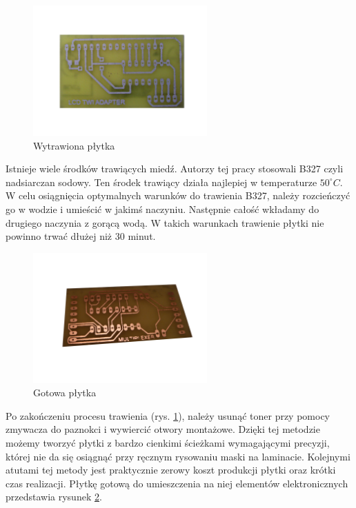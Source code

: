 \begin{figure}[!ht]
 \centering
 \includegraphics[height=50mm]{../images/appendix/wytrawiona.JPG}
 \caption{Wytrawiona płytka}
 \label{fig:WytrawionaPlytka}
\end{figure}

Istnieje wiele środków trawiących miedź. Autorzy tej pracy stosowali B327 czyli nadsiarczan sodowy. Ten środek trawiący działa najlepiej w temperaturze $50^{\circ}C$. W celu osiągnięcia optymalnych warunków do trawienia B327, należy rozcieńczyć go w wodzie i umieścić w jakimś naczyniu. Następnie całość wkładamy do drugiego naczynia z gorącą wodą. W takich warunkach trawienie płytki nie powinno trwać dłużej niż 30 minut.

\begin{figure}[!ht]
 \centering
 \includegraphics[height=50mm]{../images/appendix/gotowa.JPG}
 \caption{Gotowa płytka}
 \label{fig:GotowaPlytka}
\end{figure}

Po zakończeniu procesu trawienia (rys. \ref{fig:WytrawionaPlytka}), należy usunąć toner przy pomocy zmywacza do paznokci i wywiercić otwory montażowe. Dzięki tej metodzie możemy tworzyć płytki z bardzo cienkimi ścieżkami wymagającymi precyzji, której nie da się osiągnąć przy ręcznym rysowaniu maski na laminacie. Kolejnymi atutami tej metody jest praktycznie zerowy koszt produkcji płytki oraz krótki czas realizacji. Płytkę gotową do umieszczenia na niej elementów elektronicznych przedstawia rysunek \ref{fig:GotowaPlytka}.
